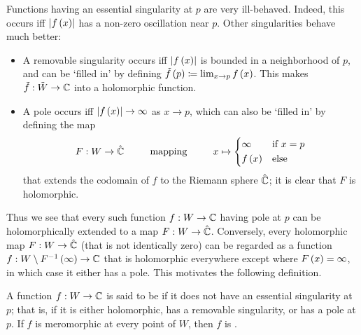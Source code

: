 \documentclass[../Moduli_Spaces_of_Riemann_Surfaces.tex]{subfiles}
\begin{document}
    \begin{remark}
        Functions having an essential singularity at $p$ are very ill-behaved. Indeed, this occurs iff $\left|f\left(x\right)\right|$ has a non-zero oscillation near $p$. Other singularities behave much better:
        \begin{itemize}
            \item A removable singularity occurs iff $\left|f\left(x\right)\right|$ is bounded in a neighborhood of $p$, and can be $\textrm{`}$filled in$\textrm{'}$ by defining $\tilde{f}\left(p\right)\coloneqq\lim_{x\to p}f\left(x\right)$. This makes $\tilde{f}:\tilde{W}\to\mathbb{C}$ into a holomorphic function.
            \vspace{-0.08in}
            \item A pole occurs iff $\left|f\left(x\right)\right|\to\infty$ as $x\to p$, which can also be $\textrm{`}$filled in$\textrm{'}$ by defining the map
                \begin{equation*}
                    F:W\to\RS\ \ \ \ \ \ \ \ \textrm{mapping}\ \ \ \ \ \ \ \ x\mapsto
                    \begin{dcases}
                        \infty & \textrm{if }x=p \\
                        f\l(x\r) & \textrm{else}
                    \end{dcases}
                \end{equation*}
                that extends the codomain of $f$ to the Riemann sphere $\hat{\mathbb{C}}$; it is clear that $F$ is holomorphic.
        \end{itemize}
        Thus we see that every such function $f:W\to\mathbb{C}$ having pole at $p$ can be holomorphically extended to a map $F:W\to\hat{\mathbb{C}}$. Conversely, every holomorphic map $F:W\to\hat{\mathbb{C}}$ (that is not identically zero) can be regarded as a function $f:W\setminus F^{-1}\left(\infty\right)\to\mathbb{C}$ that is holomorphic everywhere except where $F\left(x\right)=\infty$, in which case it either has a pole. This motivates the following definition.\exqed
    \end{remark}
    \begin{definition}
        A function $f:W\to\mathbb{C}$ is said to be  if it does not have an essential singularity at $p$; that is, if it is either holomorphic, has a removable singularity, or has a pole at $p$. If $f$ is meromorphic at every point of $W$, then $f$ is .
    \end{definition}
\end{document}
